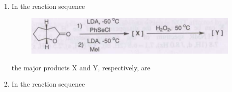 \documentclass[journal,12pt,onecolumn]{IEEEtran}
\theoremstyle{remark}
\begin{document}
\begin{enumerate}[resume]
\item In the reaction sequence
    \begin{figure}[H]
        \centering
        \includegraphics[width=0.8\columnwidth]{q37}
        \caption*{}
        \label{fig:q37}
    \end{figure}
    the major products X and Y, respectively, are
    \begin{enumerate}
\end{enumerate}
\hfill{}



\item In the reaction sequence
    \begin{figure}[H]
      

\end{figure}
\end{enumerate}
\end{document}
